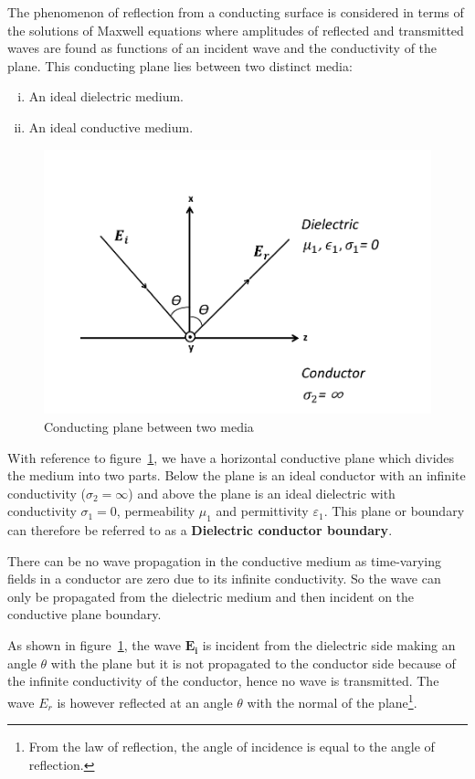 The phenomenon of reflection from a conducting surface is considered in terms of the solutions of Maxwell equations where amplitudes of reflected and transmitted waves are found as functions of an incident wave and the conductivity of the plane. This conducting plane lies between two distinct media: 
\begin{enumerate}[(i)]
\item An ideal dielectric medium.
\item An ideal conductive medium.
\end{enumerate}
\begin{figure}[h]
\centering
\includegraphics[width=1\linewidth]{graphics/dielectric_conductor_boundary}
\caption{Conducting plane between two media}
\label{fig:plane}
\end{figure}

With reference to figure~\ref{fig:plane}, we have a horizontal conductive plane which divides the medium into two parts. Below the plane is an ideal conductor with an infinite conductivity ($\sigma _2 =\infty$) and above the plane is an ideal dielectric with conductivity $\sigma_1 = 0$, permeability $\mu _1$ and	permittivity $ \varepsilon _1$. This plane or boundary can therefore be referred to as a \textbf{Dielectric conductor boundary}.

There can be no wave propagation in the conductive medium as time-varying fields in a conductor are zero due to its infinite conductivity. So the wave can only be propagated from the dielectric medium and then incident on the conductive plane boundary.

As shown in figure~\ref{fig:plane}, the wave $\boldsymbol{E_i}$  is incident from the dielectric side making an angle $ \theta $ with the plane but it is not propagated to the conductor side because of the infinite conductivity of the conductor, hence no wave is transmitted. The wave $E_r$ is however reflected at an angle $ \theta $ with the normal of the plane\footnote{
From the law of reflection, the angle of incidence is equal to the angle of reflection.
}.

